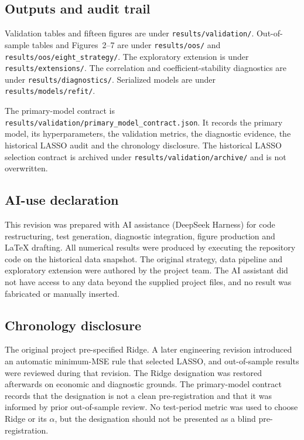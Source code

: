 \documentclass[11pt,a4paper]{article}
\begin{document}
\subsection{Outputs and audit trail}

Validation tables and fifteen figures are under \texttt{results/validation/}. Out-of-sample tables and Figures~2--7 are under \texttt{results/oos/} and \texttt{results/oos/eight\_strategy/}. The exploratory extension is under \texttt{results/extensions/}. The correlation and coefficient-stability diagnostics are under \texttt{results/diagnostics/}. Serialized models are under \texttt{results/models/refit/}.

The primary-model contract is \texttt{results/validation/primary\_model\_contract.json}. It records the primary model, its hyperparameters, the validation metrics, the diagnostic evidence, the historical LASSO audit and the chronology disclosure. The historical LASSO selection contract is archived under \texttt{results/validation/archive/} and is not overwritten.

\subsection{AI-use declaration}

This revision was prepared with AI assistance (DeepSeek Harness) for code restructuring, test generation, diagnostic integration, figure production and LaTeX drafting. All numerical results were produced by executing the repository code on the historical data snapshot. The original strategy, data pipeline and exploratory extension were authored by the project team. The AI assistant did not have access to any data beyond the supplied project files, and no result was fabricated or manually inserted.

\subsection{Chronology disclosure}

The original project pre-specified Ridge. A later engineering revision introduced an automatic minimum-MSE rule that selected LASSO, and out-of-sample results were reviewed during that revision. The Ridge designation was restored afterwards on economic and diagnostic grounds. The primary-model contract records that the designation is not a clean pre-registration and that it was informed by prior out-of-sample review. No test-period metric was used to choose Ridge or its $\alpha$, but the designation should not be presented as a blind pre-registration.
\end{document}
